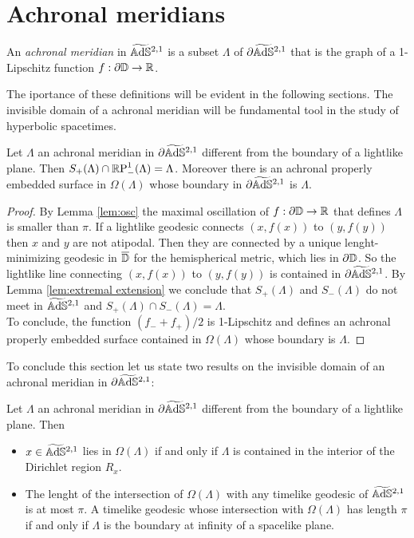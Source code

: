 \section{Achronal meridians}
\begin{definition}
    An \textit{achronal meridian} in $\AS^{2,1}$ is a subset $\Lambda$ of $\partial\AS^{2,1}$ that is the graph of a 1-Lipschitz function $f: \partial\D\to\R$.
\end{definition}
The iportance of these definitions will be evident in the following sections.
The invisible domain of a achronal meridian will be fundamental tool in the study of hyperbolic spacetimes.
\begin{lemma}
    Let $\Lambda$ an achronal meridian in $\partial\AS^{2,1}$ different from the boundary of a lightlike plane. Then $S_+(\Lambda) \cap \S_-(\Lambda)=\Lambda$. Moreover there is an achronal properly embedded surface in $\Omega(\Lambda)$ whose boundary in $\partial\AS^{2,1}$ is $\Lambda$.
\end{lemma}
\begin{proof}
    By Lemma \ref{lem:osc} the maximal oscillation of $f:\partial\D \to \R$ that defines $\Lambda$ is smaller than $\pi$. If a lightlike geodesic connects $(x,f(x))$ to $(y,f(y))$ then $x$ and $y$ are not atipodal. Then they are connected by a unique lenght-minimizing geodesic in $\overline{\D}$ for the hemispherical metric, which lies in $\partial\D$. So the lightlike line connecting $(x,f(x))$ to $(y,f(y))$ is contained in $\partial\AS^{2,1}$. By Lemma \ref{lem:extremal extension} we conclude that $S_+(\Lambda)$ and $S_-(\Lambda)$ do not meet in $\AS^{2,1}$ and $S_+(\Lambda)\cap S_-(\Lambda)=\Lambda$.\\
    To conclude, the function $(f_- + f_+) /2$ is 1-Lipschitz and defines an achronal properly embedded surface contained in $\Omega(\Lambda)$ whose boundary is $\Lambda$.
\end{proof}
To conclude this section let us state two results on the invisible domain of an achronal meridian in $\partial\AS^{2,1}$:
\begin{proposition}\label{prop:invisible1}
    Let $\Lambda$ an achronal meridian in $\partial\AS^{2,1}$ different from the boundary of a lightlike plane. Then
    \begin{itemize}
        \item $x \in \AS^{2,1}$ lies in $\Omega(\Lambda)$ if and only if $\Lambda$ is contained in the interior of the Dirichlet region $R_x$.
        \item The lenght of the intersection of $\Omega(\Lambda)$ with any timelike geodesic of $\AS^{2,1}$ is at most $\pi$. A timelike geodesic whose intersection with $\Omega(\Lambda)$ has length $\pi$ if and only if $\Lambda$ is the boundary at infinity of a spacelike plane.
    \end{itemize}
\end{proposition}
